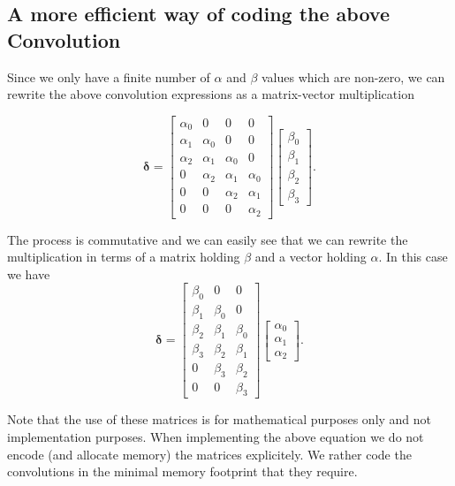 \documentclass[%
oneside,                 %
final,                   %
10pt]{article}
\begin{document}
\subsection{A more efficient way of coding the above Convolution}

Since we only have a finite number of $\alpha$ and $\beta$ values
which are non-zero, we can rewrite the above convolution expressions
as a matrix-vector multiplication

\[
\bm{\delta}=\begin{bmatrix}\alpha_0 & 0 & 0 & 0 \\
                            \alpha_1 & \alpha_0 & 0 & 0 \\
			    \alpha_2 & \alpha_1 & \alpha_0 & 0 \\
			    0 & \alpha_2 & \alpha_1 & \alpha_0 \\
			    0 & 0 & \alpha_2 & \alpha_1 \\
			    0 & 0 & 0 & \alpha_2
			    \end{bmatrix}\begin{bmatrix} \beta_0 \\ \beta_1 \\ \beta_2 \\ \beta_3\end{bmatrix}.
\]

The process is commutative and we can easily see that we can rewrite the multiplication in terms of  a matrix holding $\beta$ and a vector holding $\alpha$.
In this case we have
\[
\bm{\delta}=\begin{bmatrix}\beta_0 & 0 & 0  \\
                            \beta_1 & \beta_0 & 0  \\
			    \beta_2 & \beta_1 & \beta_0  \\
			    \beta_3 & \beta_2 & \beta_1 \\
			    0 & \beta_3 & \beta_2 \\
			    0 & 0 & \beta_3
			    \end{bmatrix}\begin{bmatrix} \alpha_0 \\ \alpha_1 \\ \alpha_2\end{bmatrix}.
\]

Note that the use of these matrices is for mathematical purposes only
and not implementation purposes.  When implementing the above equation
we do not encode (and allocate memory) the matrices explicitely.  We
rather code the convolutions in the minimal memory footprint that they
require.
\end{document}

